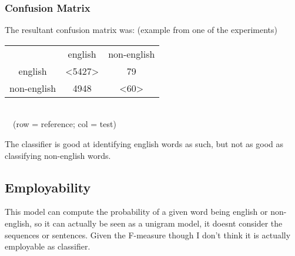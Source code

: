 \documentclass{article}
\begin{document}
            \subsubsection*{Confusion Matrix}
            The resultant confusion matrix was: (example from one of the experiments)
            \begin{center}
                \begin{tabular}{c|c|c}
                    & english & non-english\\
                    english & <5427> & 79\\
                    non-english & 4948 & <60>\\
                \end{tabular}\\~\
                (row = reference; col = test)
            \end{center}
            The classifier is good at identifying english words as such, but not as good as classifying non-english words.
        \subsection{Employability}
        This model can compute the probability of a given word being english or non-english, so it can actually be seen as a unigram model, it doesnt consider the sequences or sentences. Given the F-measure though I don't think it is actually employable as classifier.
\end{document}
